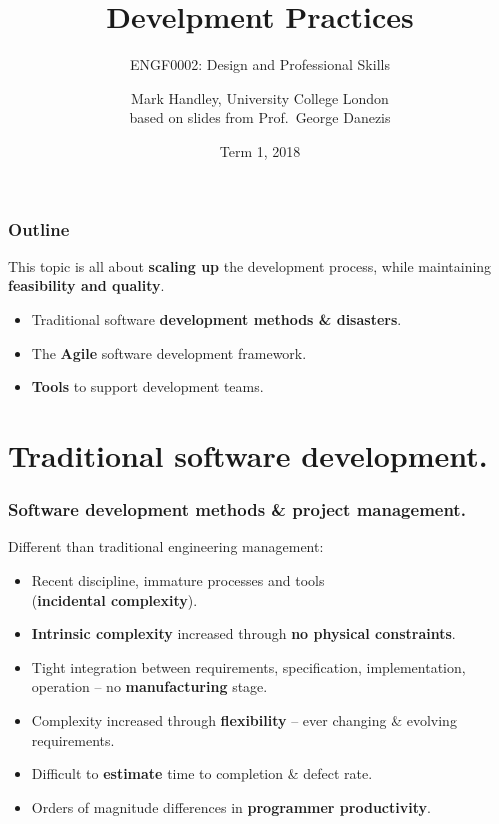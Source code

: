 \documentclass{beamer} %
\author{Mark Handley, University College London\\
\small  based on slides from Prof.\ George Danezis}
\title{Develpment Practices}
\subtitle{ENGF0002: Design and Professional Skills }
\date{Term 1, 2018}
\newcommand\emc[1]{\textcolor{midred}{\textbf{#1}}}
\begin{document}
\nobibliography*


\frame{
\titlepage
}

\begin{frame}
\frametitle{Outline}

This topic is all about \emc{scaling up} the development process, while maintaining \emc{feasibility and quality}.

\begin{itemize}
  \item Traditional software \emc{development methods \& disasters}.
  \item The \emc{Agile} software development framework.
  \item \emc{Tools} to support development teams.
\end{itemize}

\end{frame}

\section{Traditional software development.}

\begin{frame}
\frametitle{Software development methods \& project management.}

Different than traditional engineering management:
\begin{itemize}
  \item Recent discipline, immature processes and tools \\ (\emc{incidental complexity}).
  \item \emc{Intrinsic complexity} increased through \emc{no physical constraints}.
  \item Tight integration between requirements, specification, implementation, operation -- no \emc{manufacturing} stage.
  \item Complexity increased through \emc{flexibility} -- ever changing \& evolving requirements.
  \item Difficult to \emc{estimate} time to completion \& defect rate.
  \item Orders of magnitude differences in \emc{programmer productivity}.
\end{itemize}

\end{frame}
\end{document}
